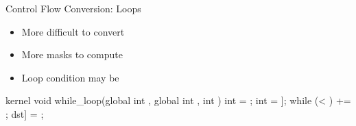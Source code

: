 \begin{frame}[fragile]{Control Flow Conversion: Loops}

\begin{minipage}[t]{0.45\linewidth}

\begin{itemize}
    \item More difficult to convert
    \item More masks to compute
    \item Loop condition may be 
\end{itemize}

\begin{codebox}[commandchars=\\\[\]]
kernel void while_loop(global int \uniform[*src],
                       global int \uniform[*dst],
                       int \uniform[step]) {
  int \varying[tid] = ;
  int \varying[val] = \uniform[src]\idx[\varying[tid]];
  while (\varying[val] < \uniform[0]) {
    \varying[val] += \uniform[step];
  }
  dst\idx[\varying[tid]] = \varying[val];
}
\end{codebox}

\end{minipage}
\hspace{1em}
\begin{minipage}[t]{0.43\linewidth}

\vspace{0.1ex}


\end{minipage}

\end{frame}

